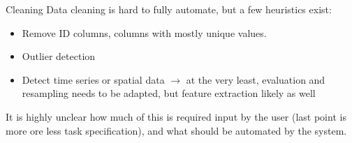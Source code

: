 \begin{frame}{Cleaning}
  Data cleaning is hard to fully automate, but a few heuristics exist:
  \begin{itemize}
    \item Remove ID columns, columns with mostly unique values.
    \item Outlier detection 
    \item Detect time series or spatial data $\rightarrow$ 
        at the very least, evaluation and resampling needs to be adapted,
        but feature extraction likely as well
  \end{itemize}

  \vspace{1cm}

  It is highly unclear how much of this is required input by the user
  (last point is more ore less task specification),
  and what should be automated by the system. 

\end{frame}

